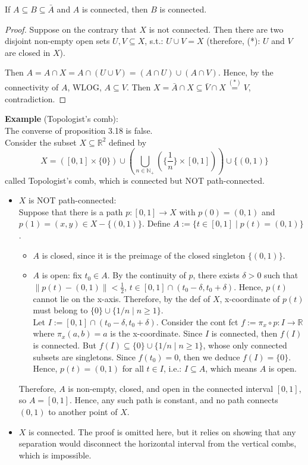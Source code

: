 \begin{proposition}
    If $A \subseteq B \subseteq \bar{A}$ and $A$ is connected, then $B$ is connected.
\end{proposition}

\begin{proof}
    Suppose on the contrary that $X$ is not connected. Then there are two disjoint non-empty open sets $U,V \subseteq X$, s.t.: $U \cup V =X$ (therefore, (*): $U$ and $V$ are closed in $X$).

    Then $A =A\cap X = A \cap (U \cup V) = (A \cap U) \cup (A \cap V)$. Hence, by the connectivity of $A$, WLOG, $A \subseteq V$. Then $X =\bar{A} \cap X \subseteq \bar{V} \cap X \overset{(*)}{=} V$, contradiction.
\end{proof}

\noindent\textbf{Example} (Topologist's comb):\\
The converse of proposition 3.18 is false.\\
Consider the subset $X \subseteq \mathbb{R}^2$ defined by 
$$X = ([0,1] \times \{0\}) \cup (\bigcup_{n \in \mathbb{N}_+} (\{\frac{1}{n}\} \times [0,1])) \cup \{(0,1)\}$$
called Topologist's comb, which is connected but NOT path-connected.
\begin{itemize}
    \item $X$ is NOT path-connected:\\
    Suppose that there is a path $p: [0,1] \rightarrow X$ with $p(0) = (0,1)$ and $p(1) = (x,y) \in X - \{(0,1)\}$. Define $A := \{ t\in [0,1] \mid p(t) = (0,1)\}$.
    \begin{itemize}
        \item $A$ is closed, since it is the preimage of the closed singleton $\{(0,1)\}$.
        \item $A$ is open: fix $t_0 \in A$. By the continuity of $p$, there exists $\delta >0$ such that $\| p(t) - (0,1)\| < \frac{1}{2}$, $t \in [0,1] \cap (t_0 - \delta ,t_0+ \delta)$. Hence, $p(t)$ cannot lie on the x-axis. Therefore, by the def of $X$, x-coordinate of $p(t)$ must belong to $\{0\}\cup \{1/n \mid n\geq 1\}$. \\
        Let $I:= [0,1] \cap (t_0 - \delta,t_0 + \delta)$. Consider the cont fct $f := \pi_x \circ p: I \rightarrow \mathbb{R}$ where $\pi_x(a,b) =a$ is the x-coordinate. Since $I$ is connected, then $f(I)$ is connected. But $f(I) \subseteq \{0\} \cup \{1/n \mid n \geq 1\}$, whose only connected subsets are singletons. Since $f(t_0)=0$, then we deduce $f(I) =\{0\}$. Hence, $p(t) =(0,1)$ for all $t \in I$, i.e.: $I \subseteq A$, which means $A$ is open.
    \end{itemize}
    Therefore, $A$ is non-empty, closed, and open in the connected interval $[0,1]$, so $A=[0,1]$. Hence, any such path is constant, and no path connects $(0,1)$ to another point of $X$.
    \item $X$ is connected. The proof is omitted here, but it relies on showing that any separation would disconnect the horizontal interval from the vertical combs, which is impossible.
\end{itemize}

